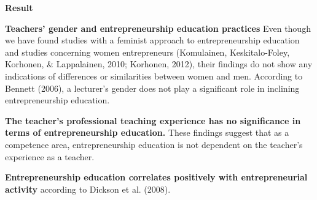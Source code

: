 \textbf{Result}

\textbf{Teachers’ gender and entrepreneurship education practices}
Even though we have found studies with a feminist approach to entrepreneurship education and studies concerning women entrepreneurs (Komulainen, Keskitalo-Foley, Korhonen, \& Lappalainen, 2010; Korhonen, 2012), their findings do not show any indications of differences or similarities between women and men. According to Bennett (2006), a lecturer’s gender does not play a significant role in inclining entrepreneurship education.

\textbf{The teacher’s professional teaching experience has no significance in terms of entrepreneurship education.} These findings suggest that as a competence area, entrepreneurship education is not dependent on the teacher’s experience as a teacher.

\textbf{Entrepreneurship education correlates positively with entrepreneurial activity} according to Dickson et al. (2008).


